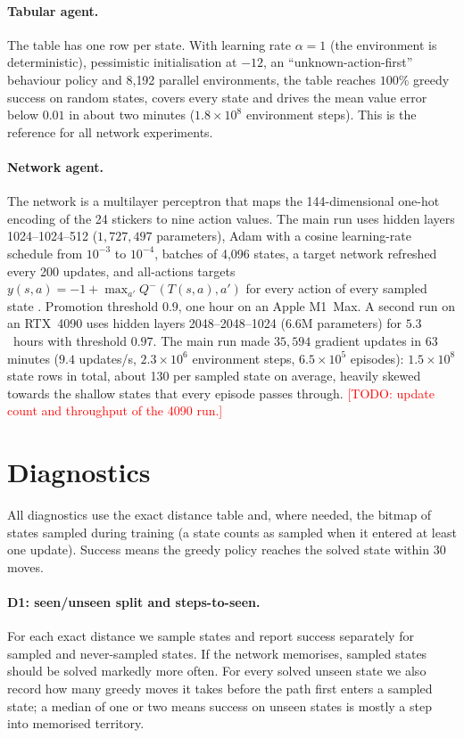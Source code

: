 \documentclass[11pt]{article}
\newcommand{\todo}[1]{\textcolor{red}{[TODO: #1]}}
\newcommand{\Q}{Q}
\begin{document}
\paragraph{Tabular agent.}
The table has one row per state. With learning rate $\alpha=1$ (the environment is
deterministic), pessimistic initialisation at $-12$, an ``unknown-action-first'' behaviour
policy and 8{,}192 parallel environments, the table reaches $100\%$ greedy success on random
states, covers every state and drives the mean value error below $0.01$ in about two minutes
($1.8\times10^8$ environment steps). This is the reference for all network experiments.

\paragraph{Network agent.}
The network is a multilayer perceptron that maps the 144-dimensional one-hot encoding of the 24
stickers to nine action values. The main run uses hidden layers 1024--1024--512
($1{,}727{,}497$ parameters), Adam with a cosine learning-rate schedule from $10^{-3}$ to
$10^{-4}$, batches of 4{,}096 states, a target network refreshed every 200 updates, and
all-actions targets $y(s,a) = -1 + \max_{a'} \Q^-(T(s,a),a')$ for every action of every sampled
state \citep{agostinelli2019}. Promotion threshold $0.9$, one hour on an Apple M1~Max.
A second run on an RTX~4090 uses hidden layers 2048--2048--1024 ($6.6$M parameters) for
$5.3$~hours with threshold $0.97$. The main run made $35{,}594$ gradient updates in 63 minutes
($9.4$ updates/s, $2.3\times10^6$ environment steps, $6.5\times10^5$ episodes): $1.5\times10^8$
state rows in total, about 130 per sampled state on average, heavily skewed towards the shallow
states that every episode passes through. \todo{update count and throughput of the 4090 run.}

\section{Diagnostics}
\label{sec:diagnostics}

All diagnostics use the exact distance table and, where needed, the bitmap of states sampled
during training (a state counts as sampled when it entered at least one update). Success means
the greedy policy reaches the solved state within 30 moves.

\paragraph{D1: seen/unseen split and steps-to-seen.}
For each exact distance we sample states and report success separately for sampled and
never-sampled states. If the network memorises, sampled states should be solved markedly more
often. For every solved unseen state we also record how many greedy moves it takes before the
path first enters a sampled state; a median of one or two means success on unseen states is
mostly a step into memorised territory.
\end{document}
